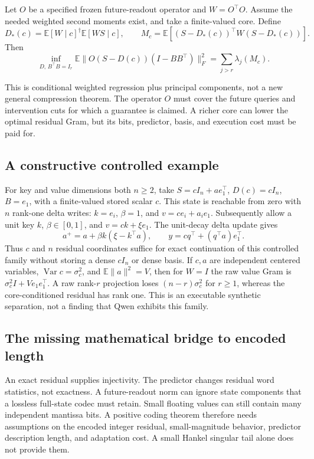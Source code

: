 \begin{proposition}
Let $O$ be a specified frozen future-readout operator and $W=O^\top O$.
Assume the needed weighted second moments exist, and take a finite-valued
core. Define
\[
 D_*(c)=\mathbb E[W\mid c]^\dagger\mathbb E[WS\mid c],\qquad
 M_c=\mathbb E[(S-D_*(c))^\top W(S-D_*(c))].
\]
Then
\[
 \inf_{D,\,B^\top B=I_r}
 \mathbb E\|O(S-D(c))(I-BB^\top)\|_F^2
 =\sum_{j>r}\lambda_j(M_c).
\]
\end{proposition}

This is conditional weighted regression plus principal components, not a
new general compression theorem. The operator $O$ must cover the future
queries and intervention cuts for which a guarantee is claimed. A richer
core can lower the optimal residual Gram, but its bits, predictor, basis,
and execution cost must be paid for.

\subsection{A constructive controlled example}
For key and value dimensions both $n\ge2$, take
$S=cI_n+a e_1^\top$, $D(c)=cI_n$, $B=e_1$, with a finite-valued
stored scalar $c$. This state is reachable from zero with $n$
rank-one delta writes: $k=e_i$, $\beta=1$, and $v=ce_i+a_i e_1$.
Subsequently allow a unit key $k$, $\beta\in[0,1]$, and
$v=ck+\xi e_1$. The unit-decay delta update gives
\[
 a^+=a+\beta k(\xi-k^\top a),\qquad
 y=cq^\top+(q^\top a)e_1^\top.
\]
Thus $c$ and $n$ residual coordinates suffice for exact continuation of
this controlled family without storing a dense $cI_n$ or dense basis.
If $c,a$ are independent centered variables, $\operatorname{Var}c=\sigma_c^2$,
and $\mathbb E\|a\|^2=V$, then for $W=I$ the raw value Gram is
$\sigma_c^2I+Ve_1e_1^\top$. A raw rank-$r$ projection loses
$(n-r)\sigma_c^2$ for $r\ge1$, whereas the core-conditioned residual
has rank one. This is an executable synthetic separation, not a finding
that Qwen exhibits this family.

\subsection{The missing mathematical bridge to encoded length}
An exact residual supplies injectivity. The predictor changes residual
word statistics, not exactness. A future-readout norm can ignore state
components that a lossless full-state codec must retain. Small floating
values can still contain many independent mantissa bits. A positive coding
theorem therefore needs assumptions on the encoded integer residual,
small-magnitude behavior, predictor description length, and adaptation
cost. A small Hankel singular tail alone does not provide them.

